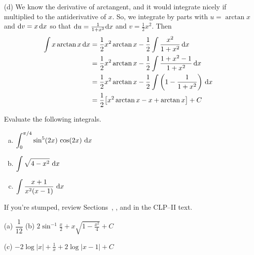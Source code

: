 \begin{solution}
\noindent (d)
We know the derivative of arctangent, and it would integrate nicely if multiplied to the antiderivative of $x$. So, we
integrate by parts with $u=\arctan x$ and $\mathrm{d}v=x\,\mathrm{d}x$ so that
$\mathrm{d}u=\frac{1}{1+x^2}\mathrm{d}x$ and $v=\frac{1}{2} x^2$. Then
\begin{align*}
\int x\arctan  x\,\mathrm{d}x&= \frac{1}{2} x^2\arctan  x
               -\frac{1}{2}\int \frac{x^2}{1+x^2}\,\mathrm{d}x \\
&= \frac{1}{2} x^2\arctan  x-\frac{1}{2}\int \frac{1+x^2-1}{1+x^2}\,\mathrm{d}x\cr
&= \frac{1}{2} x^2\arctan  x-\frac{1}{2}\int \left(1-\frac{1}{1+x^2}\right)\,\mathrm{d}x\cr
&=\frac{1}{2}\big[ x^2\arctan  x -x +\arctan x\big]+C
\end{align*}



\end{solution}

\begin{question}[M121 2000A]
Evaluate the following integrals.
\begin{enumerate}[(a)]
\item
$\displaystyle\int_0^{\pi/4}\sin^5(2x)\,\cos(2x)\ \dee{x}$
\item
$\displaystyle\int\sqrt{4-x^2}\ \dee{x}$
\item
$\displaystyle\int\frac{x+1}{x^2(x-1)}\ \dee{x}$
\end{enumerate}
\end{question}

\begin{hint}
If you're stumped, review Sections~,
,
and
 in the CLP--II text.
\end{hint}

\begin{answer} (a)
$\dfrac{1}{12}$
\qquad (b)
$\displaystyle2\sin^{-1}\frac{x}{2}+x\sqrt{1-\frac{x^2}{4}}+C$

\noindent (c)
$\displaystyle-2\log|x|+\frac{1}{x}+2\log|x-1|+C$
\end{answer}

